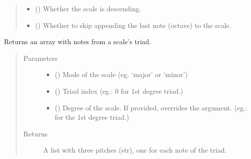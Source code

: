\documentclass[letterpaper,10pt,english]{sphinxmanual}
\begin{document}
\begin{fulllineitems}
\begin{fulllineitems}
\begin{quote}
\begin{description}
\begin{itemize}
\item {} 
 () \textendash{} Whether the scale is descending.

\item {} 
 () \textendash{} Whether to skip appending the last
note (octave) to the scale.

\end{itemize}

\end{description}\end{quote}

\end{fulllineitems}


\begin{fulllineitems}
\label{\detokenize{index:birdears.scale.ChromaticScale.get_triad}}
Returns an array with notes from a scale’s triad.
\begin{quote}\begin{description}
\item[{Parameters}] \leavevmode\begin{itemize}
\item {} 
 () \textendash{} Mode of the scale (eg. ‘major’ or ‘minor’)

\item {} 
 () \textendash{} Triad index (eg.: 0 for 1st degree triad.)

\item {} 
 () \textendash{} Degree of the scale. If provided, overrides the
 argument. (eg.:  for the 1st degree triad.)

\end{itemize}

\item[{Returns}] \leavevmode
A list with three pitches (str), one for each note of the triad.

\end{description}\end{quote}

\end{fulllineitems}


\end{fulllineitems}
\end{document}
